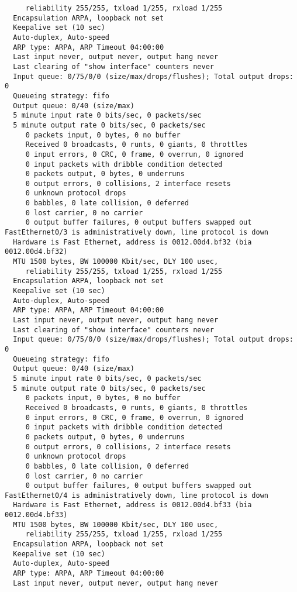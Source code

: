 \begin{verbatim}
     reliability 255/255, txload 1/255, rxload 1/255
  Encapsulation ARPA, loopback not set
  Keepalive set (10 sec)
  Auto-duplex, Auto-speed
  ARP type: ARPA, ARP Timeout 04:00:00
  Last input never, output never, output hang never
  Last clearing of "show interface" counters never
  Input queue: 0/75/0/0 (size/max/drops/flushes); Total output drops: 0
  Queueing strategy: fifo
  Output queue: 0/40 (size/max)
  5 minute input rate 0 bits/sec, 0 packets/sec
  5 minute output rate 0 bits/sec, 0 packets/sec
     0 packets input, 0 bytes, 0 no buffer
     Received 0 broadcasts, 0 runts, 0 giants, 0 throttles
     0 input errors, 0 CRC, 0 frame, 0 overrun, 0 ignored
     0 input packets with dribble condition detected
     0 packets output, 0 bytes, 0 underruns
     0 output errors, 0 collisions, 2 interface resets
     0 unknown protocol drops
     0 babbles, 0 late collision, 0 deferred
     0 lost carrier, 0 no carrier
     0 output buffer failures, 0 output buffers swapped out
FastEthernet0/3 is administratively down, line protocol is down 
  Hardware is Fast Ethernet, address is 0012.00d4.bf32 (bia 0012.00d4.bf32)
  MTU 1500 bytes, BW 100000 Kbit/sec, DLY 100 usec, 
     reliability 255/255, txload 1/255, rxload 1/255
  Encapsulation ARPA, loopback not set
  Keepalive set (10 sec)
  Auto-duplex, Auto-speed
  ARP type: ARPA, ARP Timeout 04:00:00
  Last input never, output never, output hang never
  Last clearing of "show interface" counters never
  Input queue: 0/75/0/0 (size/max/drops/flushes); Total output drops: 0
  Queueing strategy: fifo
  Output queue: 0/40 (size/max)
  5 minute input rate 0 bits/sec, 0 packets/sec
  5 minute output rate 0 bits/sec, 0 packets/sec
     0 packets input, 0 bytes, 0 no buffer
     Received 0 broadcasts, 0 runts, 0 giants, 0 throttles
     0 input errors, 0 CRC, 0 frame, 0 overrun, 0 ignored
     0 input packets with dribble condition detected
     0 packets output, 0 bytes, 0 underruns
     0 output errors, 0 collisions, 2 interface resets
     0 unknown protocol drops
     0 babbles, 0 late collision, 0 deferred
     0 lost carrier, 0 no carrier
     0 output buffer failures, 0 output buffers swapped out
FastEthernet0/4 is administratively down, line protocol is down 
  Hardware is Fast Ethernet, address is 0012.00d4.bf33 (bia 0012.00d4.bf33)
  MTU 1500 bytes, BW 100000 Kbit/sec, DLY 100 usec, 
     reliability 255/255, txload 1/255, rxload 1/255
  Encapsulation ARPA, loopback not set
  Keepalive set (10 sec)
  Auto-duplex, Auto-speed
  ARP type: ARPA, ARP Timeout 04:00:00
  Last input never, output never, output hang never

\end{verbatim}
